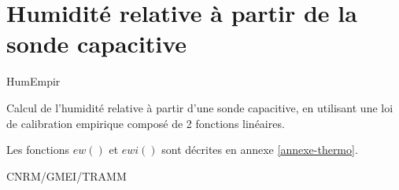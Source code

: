 %
\section{Humidit\'e relative \`a partir de la sonde capacitive}

 {\sf HumEmpir}

Calcul de l'humidit\'e relative \`a partir d'une 
sonde capacitive, en utilisant une loi
de calibration empirique compos\'e de 2 fonctions
lin\'eaires.

\bigskip






Les fonctions $ew()$ et $ewi()$ sont d\'ecrites en annexe
\ref{annexe-thermo}.

CNRM/GMEI/TRAMM

